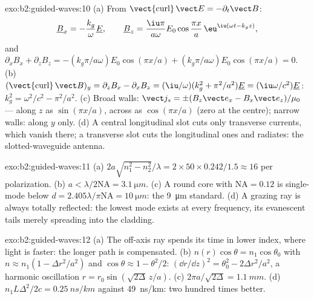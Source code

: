 \begin{solution}{exo:b2:guided-waves:10}
(a) From $\operatorname{\vect{curl}}\vect E = -\partial_t\vect B$:
\[
\underline B_x = -\frac{k_g}\omega\underline E , \qquad
\underline B_z = \frac{\iu\pi}{a\omega}E_0\cos\frac{\pi x}a\,\eu^{\iu(\omega t - k_gz)} ,
\]
and $\partial_xB_x + \partial_zB_z = -(k_g\pi/a\omega)E_0\cos(\pi x/a) + (k_g\pi/a\omega)E_0
\cos(\pi x/a) = 0$. (b) $(\operatorname{\vect{curl}}\vect B)_y = \partial_zB_x - \partial_xB_z =
(\iu/\omega)(k_g^2 + \pi^2/a^2)\underline E = (\iu\omega/c^2)\underline E$: $k_g^2 = \omega^2/c^2 - \pi^2/a^2$.
(c) Broad walls: $\vect j_s = \pm(B_z\vect e_x - B_x\vect e_z)/\mu_0$ --- along $z$
as $\sin(\pi x/a)$, across as $\cos(\pi x/a)$ (zero at the centre); narrow
walls: along $y$ only. (d) A central longitudinal slot cuts only
transverse currents, which vanish there; a transverse slot cuts the
longitudinal ones and radiates: the slotted-waveguide antenna.
\end{solution}

\begin{solution}{exo:b2:guided-waves:11}
(a) $2a\sqrt{n_1^2 - n_2^2}/\lambda = 2 \times 50 \times 0.242/1.5 \approx 16$ per polarization.
(b) $a < \lambda/2\mathrm{NA} = \qty{3.1}{\micro m}$. (c) A round core with $\mathrm{NA} =
0.12$ is single-mode below $d = 2.405\lambda/\pi\mathrm{NA} = \qty{10}{\micro m}$: the
\qty{9}{\micro m} standard. (d) A grazing ray is always totally reflected: the
lowest mode exists at every frequency, its evanescent tails merely
spreading into the cladding.
\end{solution}

\begin{solution}{exo:b2:guided-waves:12}
(a) The off-axis ray spends its time in lower index, where light is
faster: the longer path is compensated. (b) $n(r)\cos\theta = n_1\cos\theta_0$
with $n \approx n_1(1 - \Delta r^2/a^2)$ and $\cos\theta \approx 1 - \theta^2/2$: $(\dd r/\dd z)^2 =
\theta_0^2 - 2\Delta r^2/a^2$, a harmonic oscillation $r = r_0\sin(\sqrt{2\Delta}\,z/a)$.
(c) $2\pi a/\sqrt{2\Delta} = \qty{1.1}{mm}$. (d) $n_1L\Delta^2/2c = \qty{0.25}{ns/km}$ against
\qty{49}{ns/km}: two hundred times better.
\end{solution}

